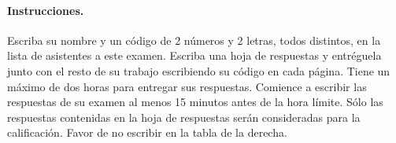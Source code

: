 \documentclass[addpoints,answers,10pt]{exam}
\begin{document}


\bigskip
\begin{minipage}{0.6\textwidth}
\paragraph{Instrucciones.} Escriba su nombre y un código de 2 números y 2 letras, todos distintos, en la lista de asistentes a este examen. Escriba una hoja de respuestas y entréguela junto con el resto de su trabajo escribiendo su código en cada página. Tiene un máximo de dos horas para entregar sus respuestas. Comience a escribir las respuestas de su examen al menos 15 minutos antes de la hora límite. Sólo las respuestas contenidas en la hoja de respuestas serán consideradas para la calificación. 
Favor de no escribir en la tabla de la derecha.
\end{minipage}%
\begin{minipage}{0.1\textwidth}
\hfill
\end{minipage}%
\begin{minipage}{0.3\textwidth}
\addpoints	
\gradetable[v][questions]
\end{minipage}
\end{document}
